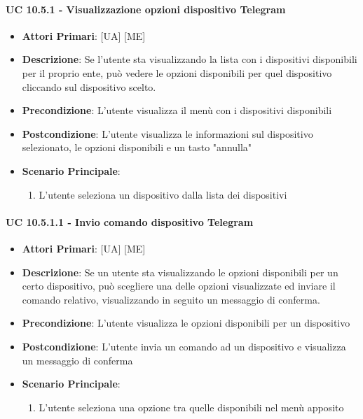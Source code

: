 			\paragraph{UC 10.5.1 - Visualizzazione opzioni dispositivo Telegram}
			\begin{itemize}
				\item \textbf{Attori Primari}: [UA] [ME]
				\item \textbf{Descrizione}: Se l'utente sta visualizzando la lista con i dispositivi disponibili per il proprio ente, può vedere le opzioni disponibili per quel dispositivo cliccando sul dispositivo scelto. 
				\item \textbf{Precondizione}: L'utente visualizza il menù con i dispositivi disponibili
				\item \textbf{Postcondizione}:
				L'utente visualizza le informazioni sul dispositivo selezionato, le opzioni disponibili e un tasto "annulla"
				\item \textbf{Scenario Principale}:
				\begin{enumerate}
					\item{L'utente seleziona un dispositivo dalla lista dei dispositivi}
				\end{enumerate}	
			\end{itemize}

			\paragraph{UC 10.5.1.1 - Invio comando dispositivo Telegram}
			\begin{itemize}
				\item \textbf{Attori Primari}: [UA] [ME]
				\item \textbf{Descrizione}: Se un utente sta visualizzando le opzioni disponibili per un certo dispositivo, può scegliere una delle opzioni visualizzate ed inviare il comando relativo, visualizzando in seguito un messaggio di conferma.
				\item \textbf{Precondizione}: L'utente visualizza le opzioni disponibili per un dispositivo
				\item \textbf{Postcondizione}: L'utente invia un comando ad un dispositivo e visualizza un messaggio di conferma
				\item \textbf{Scenario Principale}:
				\begin{enumerate}
					\item{L'utente seleziona una opzione tra quelle disponibili nel menù apposito}
				\end{enumerate}	
			\end{itemize}

